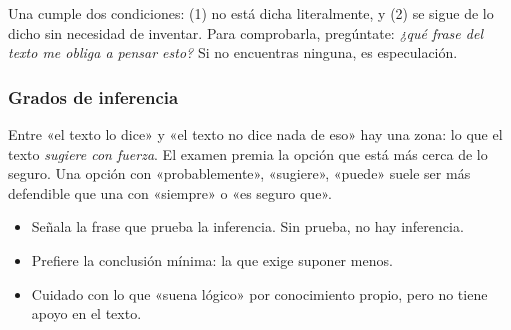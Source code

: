 

Una  cumple dos condiciones: (1) no está dicha literalmente, y (2) se sigue de lo dicho sin
necesidad de inventar. Para comprobarla, pregúntate: \emph{¿qué frase del texto me obliga a pensar esto?} Si no encuentras
ninguna, es especulación.


\subsubsection{Grados de inferencia}
Entre «el texto lo dice» y «el texto no dice nada de eso» hay una zona: lo que el texto \emph{sugiere con fuerza}. El
examen premia la opción que está más cerca de lo seguro. Una opción con «probablemente», «sugiere», «puede» suele ser más
defendible que una con «siempre» o «es seguro que».

\begin{regla}
\begin{itemize}
  \item Señala la frase que prueba la inferencia. Sin prueba, no hay inferencia.
  \item Prefiere la conclusión mínima: la que exige suponer menos.
  \item Cuidado con lo que «suena lógico» por conocimiento propio, pero no tiene apoyo en el texto.
\end{itemize}
\end{regla}


